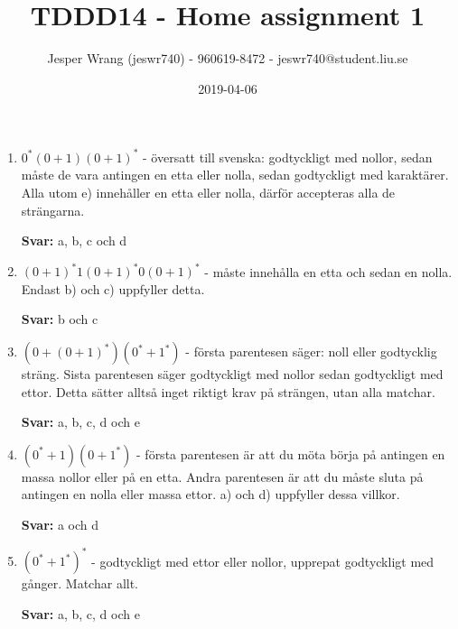 \documentclass{article}
\title{TDDD14 - Home assignment 1}
\author{Jesper Wrang (jeswr740) - 960619-8472 - jeswr740@student.liu.se}
\date{2019-04-06}
\begin{document}
\maketitle


\section{}

\begin{enumerate}[label=(\alph*)]
    \item $0^*(0+1)(0+1)^*$  - översatt till svenska: godtyckligt med nollor, sedan måste de vara antingen en etta eller nolla, sedan godtyckligt med karaktärer. Alla utom e) innehåller en etta eller nolla, därför accepteras alla de strängarna.

    \textbf{Svar:} a, b, c och d

    \item $(0+1)^*1(0+1)^*0(0+1)^*$ - måste innehålla en etta och sedan en nolla. Endast b) och c) uppfyller detta.

    \textbf{Svar:} b och c

    \item $(0 + (0 + 1)^*)(0^*+1^*)$ - första parentesen säger: noll eller godtycklig sträng. Sista parentesen säger godtyckligt med nollor sedan godtyckligt med ettor. Detta sätter alltså inget riktigt krav på strängen, utan alla matchar.

    \textbf{Svar:} a, b, c, d och e

    \item $(0^*+1)(0+1^*)$ - första parentesen är att du möta börja på antingen en massa nollor eller på en etta. Andra parentesen är att du måste sluta på antingen en nolla eller massa ettor. a) och d) uppfyller dessa villkor.

    \textbf{Svar:} a och d

    \item $(0^*+1^*)^*$ - godtyckligt med ettor eller nollor, upprepat godtyckligt med gånger. Matchar allt. 

    \textbf{Svar:} a, b, c, d och e
\end{enumerate}


\end{document}
